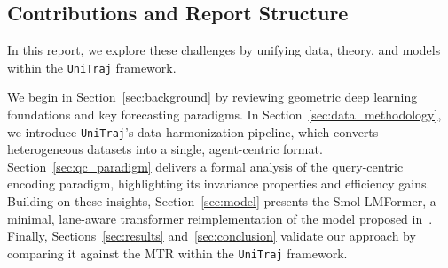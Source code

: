 \subsection{Contributions and Report Structure}
In this report, we explore these challenges by unifying data, theory, and models within the \texttt{UniTraj} framework.

We begin in Section~\ref{sec:background} by reviewing geometric deep learning foundations and key forecasting paradigms. In Section~\ref{sec:data_methodology}, we introduce \texttt{UniTraj}'s data harmonization pipeline, which converts heterogeneous datasets into a single, agent-centric format. Section~\ref{sec:qc_paradigm} delivers a formal analysis of the query-centric encoding paradigm, highlighting its invariance properties and efficiency gains. Building on these insights, Section~\ref{sec:model} presents the Smol-LMFormer, a minimal, lane-aware transformer reimplementation of the model proposed in~\cite{lmformerYadav2025}. Finally, Sections~\ref{sec:results} and~\ref{sec:conclusion} validate our approach by comparing it against the MTR within the \texttt{UniTraj} framework.

\newpage